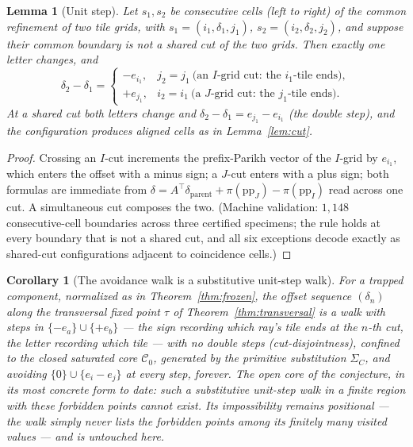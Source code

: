 \documentclass[11pt]{article}
\newtheorem{lemma}[theorem]{Lemma}
\newtheorem{corollary}[theorem]{Corollary}
\begin{document}
\begin{lemma}[Unit step]\label{lem:unitstep}
Let $s_1,s_2$ be consecutive cells (left to right) of the common
refinement of two tile grids, with $s_1=(i_1,\delta_1,j_1)$,
$s_2=(i_2,\delta_2,j_2)$, and suppose their common boundary is not a
shared cut of the two grids. Then exactly one letter changes, and
\[
\delta_2-\delta_1=
\begin{cases}
-e_{i_1}, & j_2=j_1 \ \text{(an $I$-grid cut: the $i_1$-tile ends)},\\
+e_{j_1}, & i_2=i_1 \ \text{(a $J$-grid cut: the $j_1$-tile ends)}.
\end{cases}
\]
At a shared cut both letters change and
$\delta_2-\delta_1=e_{j_1}-e_{i_1}$ (the double step), and the
configuration produces aligned cells as in Lemma~\ref{lem:cut}.
\end{lemma}

\begin{proof}
Crossing an $I$-cut increments the prefix-Parikh vector of the $I$-grid
by $e_{i_1}$, which enters the offset with a minus sign; a $J$-cut
enters with a plus sign; both formulas are immediate from
$\delta=A^{\!\top}\delta_{\mathrm{parent}}+\pi(\mathrm{pp}_J)-\pi(\mathrm{pp}_I)$
read across one cut. A simultaneous cut composes the two.
(Machine validation: $1{,}148$ consecutive-cell boundaries across three
certified specimens; the rule holds at every boundary that is not a
shared cut, and all six exceptions decode exactly as shared-cut
configurations adjacent to coincidence cells.)
\end{proof}

\begin{corollary}[The avoidance walk is a substitutive unit-step
walk]\label{cor:walk}
For a trapped component, normalized as in Theorem~\ref{thm:frozen},
the offset sequence $(\delta_n)$ along the transversal fixed point
$\tau$ of Theorem~\ref{thm:transversal} is a walk with steps in
$\{-e_a\}\cup\{+e_b\}$ --- the sign recording which ray's tile ends at
the $n$-th cut, the letter recording which tile --- with no double
steps (cut-disjointness), confined to the closed saturated core
$\mathcal{C}_0$, generated by the primitive substitution $\Sigma_C$,
and avoiding $\{0\}\cup\{e_i-e_j\}$ at every step, forever. The open
core of the conjecture, in its most concrete form to date: such a
substitutive unit-step walk in a finite region with these forbidden
points cannot exist. Its impossibility remains positional --- the walk
simply never lists the forbidden points among its finitely many
visited values --- and is untouched here.
\end{corollary}
\end{document}
